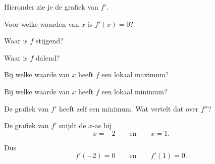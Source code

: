 \documentclass{ximera}
\begin{document}

\begin{oefening}{\oefU\ESS}

Hieronder zie je de grafiek van $f'$.

\begin{center}
\end{center}

\begin{question}
Voor welke waarden van $x$ is $f'(x)=0$?
\end{question}

\begin{question}
Waar is $f$ stijgend?
\end{question}

\begin{question}
Waar is $f$ dalend?
\end{question}

\begin{question}
Bij welke waarde van $x$ heeft $f$ een lokaal maximum?
\end{question}

\begin{question}
Bij welke waarde van $x$ heeft $f$ een lokaal minimum?
\end{question}

\begin{question}
De grafiek van $f'$ heeft zelf een minimum.
Wat vertelt dat over $f''$?
\end{question}

\begin{oplossing}

De grafiek van $f'$ snijdt de $x$-as bij
\[
x=-2
\qquad\text{en}\qquad
x=1.
\]

Dus
\[
f'(-2)=0
\qquad\text{en}\qquad
f'(1)=0.
\]


\end{oplossing}
\end{oefening}
\end{document}
